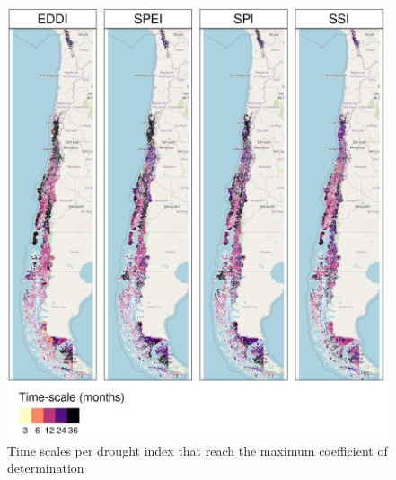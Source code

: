 \documentclass[
  authoryear,
  preprint,
  3p,
  onecolumn]{elsarticle}
\begin{document}
\begin{figure}[!ht]

{\centering \includegraphics{../output/figs/mapa_cor_selec_indices_zcNDVI6.png}

}

\caption{\label{fig-corTimeScale}Time scales per drought index that
reach the maximum coefficient of determination}

\end{figure}
\end{document}
